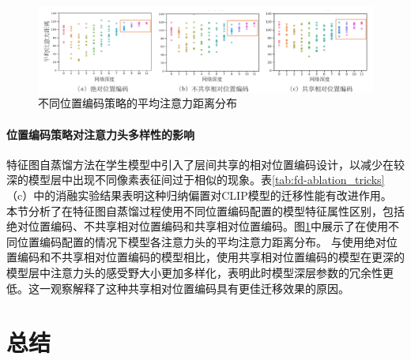 \begin{figure}
  \centering
  \includegraphics[width=1.0\linewidth]{figures/fd_compare_all_ape_rpe.pdf}
  \caption{不同位置编码策略的平均注意力距离分布}
  \label{fig:fd_compare_all_ape_rpe}
\end{figure}

\paragraph{位置编码策略对注意力头多样性的影响} 特征图自蒸馏方法在学生模型中引入了层间共享的相对位置编码设计，以减少在较深的模型层中出现不同像素表征间过于相似的现象。表\ref{tab:fd-ablation_tricks}（c）中的消融实验结果表明这种归纳偏置对CLIP模型的迁移性能有改进作用。
本节分析了在特征图自蒸馏过程使用不同位置编码配置的模型特征属性区别，包括绝对位置编码、不共享相对位置编码和共享相对位置编码。图\ref{fig:fd_compare_all_ape_rpe}中展示了在使用不同位置编码配置的情况下模型各注意力头的平均注意力距离分布。
与使用绝对位置编码和不共享相对位置编码的模型相比，使用共享相对位置编码的模型在更深的模型层中注意力头的感受野大小更加多样化，表明此时模型深层参数的冗余性更低。这一观察解释了这种共享相对位置编码具有更佳迁移效果的原因。


\section{总结}
\label{sec:fd-summary}



